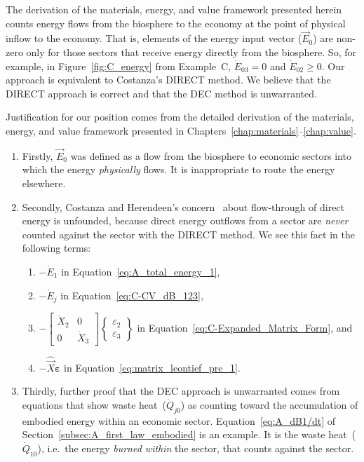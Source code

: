 The derivation of the materials, energy, and value framework
presented herein counts energy flows from the biosphere to the economy
at the point of physical inflow to the economy. 
That is, elements of the energy input vector 
($\vec{E}_{0}$) are non-zero only for those sectors 
that receive energy directly from the biosphere. 
So, for example, in Figure~\ref{fig:C_energy} from Example~C, 
$\dot{E}_{03} = 0$ and $\dot{E}_{02} \ge 0$. 
Our approach is equivalent to Costanza's DIRECT method.
We believe that the DIRECT approach is correct and that the DEC method is unwarranted.

Justification for our position comes from the detailed derivation
of the materials, energy, and value framework presented in 
Chapters~\ref{chap:materials}--\ref{chap:value}. 

\begin{enumerate}
	\item 
		Firstly, $\vec{E}_{0}$ was defined as a flow 
		from the biosphere to economic sectors
		into which the energy \emph{physically} flows.
		It is inappropriate to route the energy elsewhere.
	\item 
		Secondly, Costanza and Herendeen's 
		concern~\cite[pp. 130 \& 138]{Costanza:1984tq}
		about flow-through of direct energy is unfounded, 
		because direct energy outflows from a sector
		are \emph{never} counted against the sector
		with the DIRECT method.
		We see this fact in the following terms:
			\begin{enumerate}
				\item
					{$- \dot{E}_{1}$ in 
					Equation~\ref{eq:A_total_energy_1},}
				\item
					{$- \dot{E}_{j}$ in Equation~\ref{eq:C-CV_dB_123},}
				\item
					{$- 
						\begin{bmatrix}
							\dot{X}_{2} & 0          \\
							0           & \dot{X}_{3}
						\end{bmatrix}
						\begin{Bmatrix}
							\varepsilon_{2}\\
							\varepsilon_{3}
						\end{Bmatrix}
					$
					in Equation~\ref{eq:C-Expanded_Matrix_Form}, and}
				\item
					{$- \hat{\vec{X}}\boldsymbol{\varepsilon}$ 
					in Equation~\ref{eq:matrix_leontief_pre_1}.}
			\end{enumerate}
	\item
		Thirdly, further proof that the DEC approach is unwarranted
		comes from equations that show waste 
		heat~($\dot{Q}_{j0}$) as counting toward 
		the accumulation of embodied energy within 
		an economic sector.
		Equation~\ref{eq:A_dB1/dt} of 
		Section~\ref{subsec:A_first_law_embodied}
		is an example. 
		It is the waste heat~($\dot{Q}_{10}$), 
		i.e.\ the energy \emph{burned within} the sector,
		that counts against the sector.
\end{enumerate}
